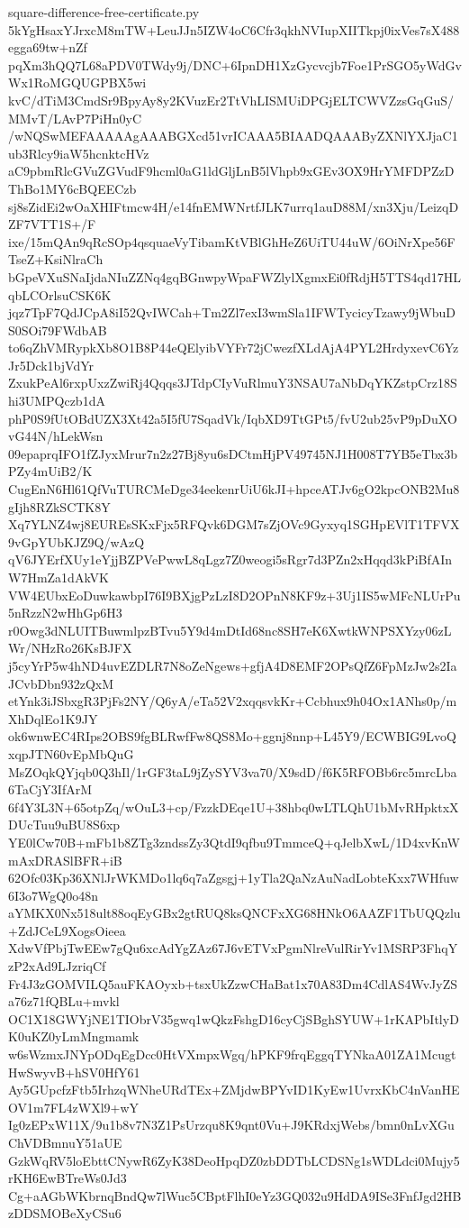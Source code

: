 \documentclass[11pt]{article}
\theoremstyle{definition}
\theoremstyle{remark}
\begin{document}
\begin{filecontents*}[overwrite]{square-difference-free-certificate.py}
5kYgHsaxYJrxcM8mTW+LeuJJn5IZW4oC6Cfr3qkhNVIupXIITkpj0ixVes7sX488egga69tw+nZf
pqXm3hQQ7L68aPDV0TWdy9j/DNC+6IpnDH1XzGycvcjb7Foe1PrSGO5yWdGvWx1RoMGQUGPBX5wi
kvC/dTiM3CmdSr9BpyAy8y2KVuzEr2TtVhLISMUiDPGjELTCWVZzsGqGuS/MMvT/LAvP7PiHn0yC
/wNQSwMEFAAAAAgAAABGXcd51vrICAAA5BIAADQAAAByZXNlYXJjaC1ub3Rlcy9iaW5hcnktcHVz
aC9pbmRlcGVuZGVudF9hcml0aG1ldGljLnB5lVhpb9xGEv3OX9HrYMFDPZzDThBo1MY6cBQEECzb
sj8sZidEi2wOaXHIFtmcw4H/e14fnEMWNrtfJLK7urrq1auD88M/xn3Xju/LeizqDZF7VTT1S+/F
ixe/15mQAn9qRcSOp4qsquaeVyTibamKtVBlGhHeZ6UiTU44uW/6OiNrXpe56FTseZ+KsiNlraCh
bGpeVXuSNaIjdaNIuZZNq4gqBGnwpyWpaFWZlylXgmxEi0fRdjH5TTS4qd17HLqbLCOrlsuCSK6K
jqz7TpF7QdJCpA8iI52QvIWCah+Tm2Zl7exI3wmSla1IFWTycicyTzawy9jWbuDS0SOi79FWdbAB
to6qZhVMRypkXb8O1B8P44eQElyibVYFr72jCwezfXLdAjA4PYL2HrdyxevC6YzJr5Dck1bjVdYr
ZxukPeAl6rxpUxzZwiRj4Qqqs3JTdpCIyVuRlmuY3NSAU7aNbDqYKZstpCrz18Shi3UMPQczb1dA
phP0S9fUtOBdUZX3Xt42a5I5fU7SqadVk/IqbXD9TtGPt5/fvU2ub25vP9pDuXOvG44N/hLekWsn
09epaprqIFO1fZJyxMrur7n2z27Bj8yu6sDCtmHjPV49745NJ1H008T7YB5eTbx3bPZy4mUiB2/K
CugEnN6Hl61QfVuTURCMeDge34eekenrUiU6kJI+hpceATJv6gO2kpcONB2Mu8gIjh8RZkSCTK8Y
Xq7YLNZ4wj8EUREsSKxFjx5RFQvk6DGM7sZjOVc9Gyxyq1SGHpEVlT1TFVX9vGpYUbKJZ9Q/wAzQ
qV6JYErfXUy1eYjjBZPVePwwL8qLgz7Z0weogi5sRgr7d3PZn2xHqqd3kPiBfAInW7HmZa1dAkVK
VW4EUbxEoDuwkawbpI76I9BXjgPzLzI8D2OPnN8KF9z+3Uj1IS5wMFcNLUrPu5nRzzN2wHhGp6H3
r0Owg3dNLUITBuwmlpzBTvu5Y9d4mDtId68nc8SH7eK6XwtkWNPSXYzy06zLWr/NHzRo26KsBJFX
j5cyYrP5w4hND4uvEZDLR7N8oZeNgews+gfjA4D8EMF2OPsQfZ6FpMzJw2s2IaJCvbDbn932zQxM
etYnk3iJSbxgR3PjFs2NY/Q6yA/eTa52V2xqqsvkKr+Ccbhux9h04Ox1ANhs0p/mXhDqlEo1K9JY
ok6wnwEC4RIps2OBS9fgBLRwfFw8QS8Mo+ggnj8nnp+L45Y9/ECWBIG9LvoQxqpJTN60vEpMbQuG
MsZOqkQYjqb0Q3hIl/1rGF3taL9jZySYV3va70/X9sdD/f6K5RFOBb6rc5mrcLba6TaCjY3IfArM
6f4Y3L3N+65otpZq/wOuL3+cp/FzzkDEqe1U+38hbq0wLTLQhU1bMvRHpktxXDUcTuu9uBU8S6xp
YE0lCw70B+mFb1b8ZTg3zndssZy3QtdI9qfbu9TmmceQ+qJelbXwL/1D4xvKnWmAxDRASlBFR+iB
62Ofc03Kp36XNlJrWKMDo1lq6q7aZgsgj+1yTla2QaNzAuNadLobteKxx7WHfuw6I3o7WgQ0o48n
aYMKX0Nx518ult88oqEyGBx2gtRUQ8ksQNCFxXG68HNkO6AAZF1TbUQQzlu+ZdJCeL9XogsOieea
XdwVfPbjTwEEw7gQu6xcAdYgZAz67J6vETVxPgmNlreVulRirYv1MSRP3FhqYzP2xAd9LJzriqCf
Fr4J3zGOMVILQ5auFKAOyxb+tsxUkZzwCHaBat1x70A83Dm4CdlAS4WvJyZSa76z71fQBLu+mvkl
OC1X18GWYjNE1TIObrV35gwq1wQkzFshgD16cyCjSBghSYUW+1rKAPbItlyDK0uKZ0yLmMngmamk
w6sWzmxJNYpODqEgDcc0HtVXmpxWgq/hPKF9frqEggqTYNkaA01ZA1McugtHwSwyvB+hSV0HfY61
Ay5GUpcfzFtb5IrhzqWNheURdTEx+ZMjdwBPYvID1KyEw1UvrxKbC4nVanHEOV1m7FL4zWXl9+wY
Ig0zEPxW11X/9u1b8v7N3Z1PsUrzqu8K9qnt0Vu+J9KRdxjWebs/bmn0nLvXGuChVDBmnuY51aUE
GzkWqRV5loEbttCNywR6ZyK38DeoHpqDZ0zbDDTbLCDSNg1sWDLdci0Mujy5rKH6EwBTreWs0Jd3
Cg+aAGbWKbrnqBndQw7lWuc5CBptFlhI0eYz3GQ032u9HdDA9ISe3FnfJgd2HBzDDSMOBeXyCSu6

\end{filecontents*}
\end{document}
